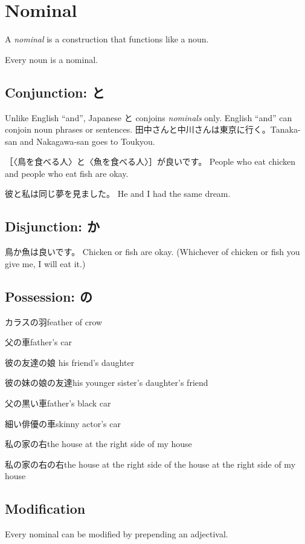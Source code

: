 \chapter{Nominal}

A \emph{nominal} is a construction that functions like a noun.

Every noun is a nominal.

\section{Conjunction: と}

Unlike English ``and'', Japanese と conjoins \emph{nominals} only.
English ``and'' can conjoin noun phrases or sentences.
田中さんと中川さんは東京に行く。Tanaka-san and Nakagawa-san goes to Toukyou.

［〈鳥を食べる人〉と〈魚を食べる人〉］が良いです。
People who eat chicken and people who eat fish are okay.

彼と私は同じ夢を見ました。
He and I had the same dream.

\section{Disjunction: か}

鳥か魚は良いです。
Chicken or fish are okay.
(Whichever of chicken or fish you give me, I will eat it.)

\section{Possession: の}

カラスの羽feather of crow

父の車father's car

彼の友達の娘 his friend's daughter

彼の妹の娘の友達his younger sister's daughter's friend

父の黒い車father's black car

細い俳優の車skinny actor's car

私の家の右the house at the right side of my house

私の家の右の右the house at the right side of the house at the right side of my house

\section{Modification}

Every nominal can be modified by prepending an adjectival.

